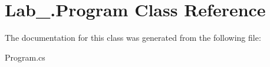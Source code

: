 \hypertarget{class_lab__3_1_1_program}{}\section{Lab\+\_.\+Program Class Reference}
\label{class_lab__3_1_1_program}


The documentation for this class was generated from the following file\+:\begin{DoxyCompactItemize}
\item 
Program.\+cs\end{DoxyCompactItemize}
